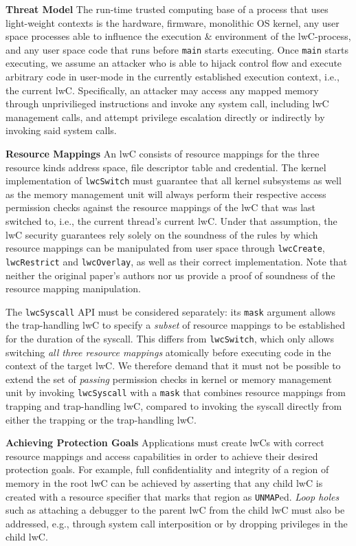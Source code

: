 \documentclass[10pt,twocolumn,letter]{article}
\begin{document}
\textbf{Threat Model}\hspace{1em}
The run-time trusted computing base of a process that uses light-weight contexts is the
hardware,
firmware,
monolithic OS kernel,
any user space processes able to influence the execution \& environment of the lwC-process,
and any user space code that runs before \lstinline{main} starts executing.
Once \lstinline{main} starts executing, we assume an attacker who is able to hijack control flow and execute arbitrary code in user-mode in the currently established execution context, i.e., the current lwC.
Specifically, an attacker may access any mapped memory through unprivilieged instructions and invoke any system call, including lwC management calls, and attempt privilege escalation directly or indirectly by invoking said system calls.

\textbf{Resource Mappings}\hspace{1em}
An lwC consists of resource mappings for the three resource kinds address space, file descriptor table and credential.
The kernel implementation of \texttt{lwcSwitch} must guarantee that all kernel subsystems as well as the memory management unit will always perform their respective access permission checks against the resource mappings of the lwC that was last switched to, i.e., the current thread's current lwC.
Under that assumption, the lwC security guarantees rely solely on the soundness of the rules by which resource mappings can be manipulated from user space through \lstinline{lwcCreate}, \lstinline{lwcRestrict} and \lstinline{lwcOverlay}, as well as their correct implementation.
Note that neither the original paper's authors nor us provide a proof of soundness of the resource mapping manipulation.

The \lstinline{lwcSyscall} API must be considered separately:
its \lstinline{mask} argument allows the trap-handling lwC to specify a \textit{subset} of resource mappings to be established for the duration of the syscall.
This differs from \lstinline{lwcSwitch}, which only allows switching \textit{all three resource mappings} atomically before executing code in the context of the target lwC.
We therefore demand that it must not be possible to extend the set of \textit{passing} permission checks in kernel or memory management unit by invoking \lstinline{lwcSyscall} with a \lstinline{mask} that combines resource mappings from trapping and trap-handling lwC, compared to invoking the syscall directly from either the trapping or the trap-handling lwC.


\textbf{Achieving Protection Goals}\hspace{1em}
Applications must create lwCs with correct resource mappings and access capabilities in order to achieve their desired protection goals.
For example, full confidentiality and integrity of a region of memory in the root lwC can be achieved by asserting that any child lwC is created with a resource specifier that marks that region as \lstinline{UNMAP}ed.
\textit{Loop holes} such as attaching a debugger to the parent lwC from the child lwC must also be addressed, e.g., through system call interposition or by dropping privileges in the child lwC.
\end{document}

